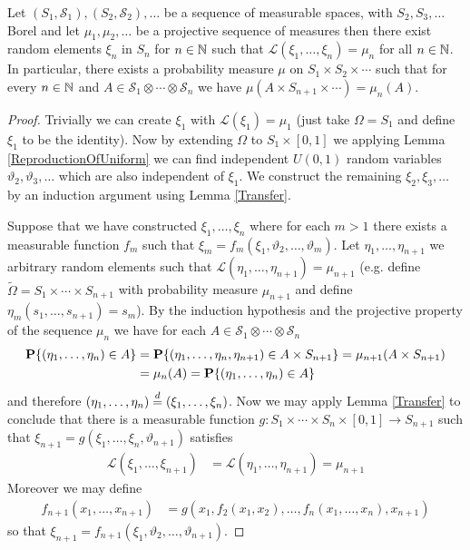 \begin{thm}\label{DaniellExtension}Let $(S_1,
  \mathcal{S}_1), (S_2, \mathcal{S}_2), \dotsc$ be a sequence of
  measurable spaces, with $S_2, S_3 , \dotsc$ Borel and let $\mu_1,
  \mu_2, \dotsc$ be a projective sequence of measures then there exist
  random elements $\xi_n$ in $S_n$ for $n \in \mathbb{N}$ such that
  $\mathcal{L}(\xi_1, \dotsc, \xi_n) = \mu_n$ for all $n \in
  \mathbb{N}$.  In particular, there exists a probability measure $\mu$
  on $S_1 \times S_2 \times \dotsb$ such that for every $n \in
  \mathbb{N}$ and $A \in \mathcal{S}_1 \otimes \dotsb \otimes
  \mathcal{S}_n$ we have $\mu(A \times S_{n+1} \times \dotsb) = \mu_n(A)$.
\end{thm}
\begin{proof}
Trivially we can create $\xi_1$ with $\mathcal{L}(\xi_1) = \mu_1$
(just take $\Omega = S_1$ and define $\xi_1$ to be the identity).  Now
by extending $\Omega$ to $S_1 \times [0,1]$ we applying Lemma
\ref{ReproductionOfUniform} we can find independent $U(0,1)$ random
variables $\vartheta_2, \vartheta_3, \dotsc$ which are also
independent of $\xi_1$.  We construct the remaining $\xi_2, \xi_3,
\dotsc$ by an induction argument using Lemma \ref{Transfer}.  

Suppose that we have constructed $\xi_1, \dotsc, \xi_n$ where for each
$m > 1$ there exists a measurable function $f_m$ such that $\xi_m =
f_m(\xi_1, \vartheta_2, \dotsc, \vartheta_m)$.  Let $\eta_1, \dotsc,
\eta_{n+1}$ we arbitrary random elements such that
$\mathcal{L}(\eta_1, \dotsc, \eta_{n+1}) = \mu_{n+1}$ (e.g. define
$\tilde{\Omega} = S_1 \times \dotsb \times S_{n+1}$ with probability
measure $\mu_{n+1}$ and define $\eta_m(s_1, \dotsc, s_{n+1}) = s_m$).
By the induction hypothesis and the projective property of the sequence $\mu_n$ we have for each $A
\in \mathcal{S}_1 \otimes \dotsb \otimes \mathcal{S}_n$
\begin{align*}
\textbf{P}\{(\eta_1, \dotsc, \eta_n) \in A\} &= \textbf{P}\{(\eta_1,
  \dotsc, \eta_n, \eta_{n+1}) \in A \times S_{n+1}\} = \mu_{n+1}(A
\times S_{n+1}) \\
&= \mu_n(A) = \textbf{P}\{(\eta_1, \dotsc, \eta_n) \in A\} 
\end{align*}
and therefore $(\eta_1, \dotsc, \eta_n) \overset{d}= (\xi_1, \dotsc,
\xi_n)$.  Now we may apply Lemma \ref{Transfer} to conclude that there
is a measurable function $g : S_1 \times \dotsb \times S_n \times
[0,1] \to S_{n+1}$ such that $\xi_{n+1} = g(\xi_1, \dotsc, \xi_n,
\vartheta_{n+1})$ satisfies 
\begin{align*}
\mathcal{L}(\xi_1, \dotsc, \xi_{n+1}) &=
\mathcal{L}(\eta_1, \dotsc, \eta_{n+1})  = \mu_{n+1}
\end{align*}
Moreover we may define 
\begin{align*}
f_{n+1}(x_1, \dotsc, x_{n+1}) &= g(x_1,
f_2(x_1, x_2), \dotsc, f_n(x_1, \dotsc, x_n), x_{n+1})
\end{align*} so that
$\xi_{n+1} = f_{n+1}(\xi_1, \vartheta_2, \dotsc, \vartheta_{n+1})$.


\end{proof}
